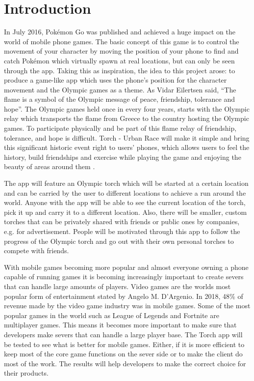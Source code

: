\documentclass[12pt,a4paper,twoside]{report}
\begin{document}
\section{Introduction}
In July 2016, Pokémon Go was published and achieved a huge impact on the world of mobile phone games\cite{2}. The basic concept of this game is to control the movement of your character by moving the position of your phone to find and catch Pokémon which virtually spawn at real locations, but can only be seen through the app. Taking this as inspiration, the idea to this project arose: to produce a game-like app which uses the phone's position for the character movement and the Olympic games as a theme. As Vidar Eilertsen said, “The flame is a symbol of the Olympic message of peace, friendship, tolerance and hope”\cite{18}. The Olympic games held once in every four years, starts with the Olympic relay which transports the flame from Greece to the country hosting the Olympic games. To participate physically and be part of this flame relay of friendship, tolerance, and hope is difficult. Torch - Urban Race will make it simple and bring this significant historic event right to users’ phones, which allows users to feel the history, build friendships and exercise while playing the game and enjoying the beauty of areas around them\cite{10}\cite{16} .

The app will feature an Olympic torch which will be started at a certain location and can be carried by the user to different locations to achieve a run around the world. Anyone with the app will be able to see the current location of the torch, pick it up and carry it to a different location. Also, there will be smaller, custom torches that can be privately shared with friends or public ones by companies, e.g. for advertisement. People will be motivated through this app to follow the progress of the Olympic torch and go out with their own personal torches to compete with friends.

With mobile games becoming more popular and almost everyone owning a phone capable of running games it is becoming increasingly important to create severs that can handle large amounts of players. Video games are the worlds most popular form of entertainment stated by Angelo M. D'Argenio. In 2018, 48\% of revenue made by the video game industry was in mobile games. Some of the most popular games in the world such as League of Legends and Fortnite are multiplayer games. This means it becomes more important to make sure that developers make severs that can handle a large player base. The Torch app will be tested to see what is better for mobile games. Either, if it is more efficient to keep most of the core game functions on the sever side or to make the client do most of the work. The results will help developers to make the correct choice for their products\cite{15}.
\newpage
\end{document}
